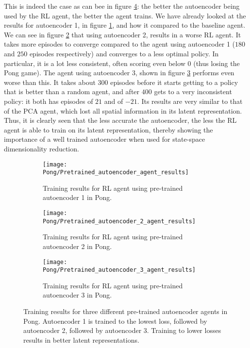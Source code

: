 This is indeed the case as can bee in figure \ref{fig:ae-results-pong}: the better the autoencoder being used by the RL agent, the better the agent trains. We have already looked at the results for autoencoder 1, in figure \ref{fig:ae1-results-pong}, and how it compared to the baseline agent. We can see in figure \ref{fig:ae2-results-pong} that using autoencoder 2, results in a worse RL agent. It takes more episodes to converge compared to the agent using autoencoder 1 ($180$ and $250$ episodes respectively) and converges to a less optimal policy. In particular, it is a lot less consistent, often scoring even below $0$ (thus losing the Pong game). The agent using autoencoder 3, shown in figure \ref{fig:ae3-results-pong} performs even worse than this. It takes about $300$ episodes before it starts getting to a policy that is better than a random agent, and after $400$ gets to a very inconsistent policy: it both has episodes of $21$ and of $-21$. Its results are very similar to that of the PCA agent, which lost all spatial information in its latent representation. Thus, it is clearly seen that the less accurate the autoencoder, the less the RL agent is able to train on its latent representation, thereby showing the importance of a well trained autoencoder when used for state-space dimensionality reduction.


\begin{figure}[h]
	\centering
	\begin{subfigure}[b]{0.49\textwidth}
		\texttt{[image: Pong/Pretrained\_autoencoder\_agent\_results]}
		\caption{Training results for RL agent using pre-trained autoencoder 1 in Pong.}
		\label{fig:ae1-results-pong}
	\end{subfigure}
	\begin{subfigure}[b]{0.49\textwidth}
		\texttt{[image: Pong/Pretrained\_autoencoder\_2\_agent\_results]}
		\caption{Training results for RL agent using pre-trained autoencoder 2 in Pong.}
		\label{fig:ae2-results-pong}
	\medskip
	\end{subfigure}
	\begin{subfigure}[b]{0.49\textwidth}
		\texttt{[image: Pong/Pretrained\_autoencoder\_3\_agent\_results]}
		\caption{Training results for RL agent using pre-trained autoencoder 3 in Pong.}
		\label{fig:ae3-results-pong}
	\end{subfigure}
	\caption{Training results for three different pre-trained autoencoder agents in Pong. Autoencoder 1 is trained to the lowest loss, followed by autoencoder 2, followed by autoencoder 3. Training to lower losses results in better latent representations.}
	\label{fig:ae-results-pong}
\end{figure}

